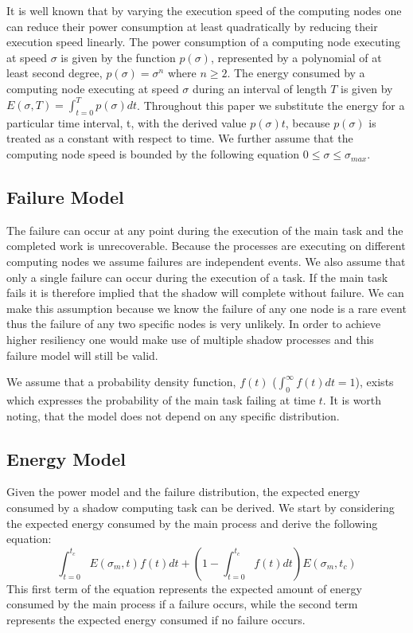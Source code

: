 It is well known that by varying the execution speed of the computing
nodes one can reduce their power consumption at least quadratically by
reducing their execution speed linearly. The power consumption of a
computing node executing at speed $\sigma$ is given by the function
$p(\sigma)$, represented by a polynomial of at least second degree,
$p(\sigma)=\sigma^n$ where $n\geq2$. The energy consumed by a
computing node executing at speed $\sigma$ during an interval of
length $T$ is given by $E(\sigma,T)=\int_{t=0}^T
p(\sigma)dt$. Throughout this paper we substitute the energy for a
particular time interval, t, with the derived value $p(\sigma)t$,
because $p(\sigma)$ is treated as a constant with respect to time. We
further assume that the computing node speed is bounded by the
following equation $0\leq\sigma\leq\sigma_{max}$.

\subsection{Failure Model}
\label{failure_model}

The failure can occur at any point during the execution of the main
task and the completed work is unrecoverable. Because the processes
are executing on different computing nodes we assume failures are
independent events. We also assume that only a single failure can
occur during the execution of a task. If the main task fails it is
therefore implied that the shadow will complete without failure. We
can make this assumption because we know the failure of any one node
is a rare event thus the failure of any two specific nodes is very
unlikely. In order to achieve higher resiliency one
would make use of multiple shadow processes and this failure model
will still be valid.

We assume that a probability density function, $f(t)$ ($\int_0^\infty
f(t)dt=1$), exists which expresses the probability of the main task
failing at time $t$. It is worth noting, that the model does not
depend on any specific distribution.

\subsection{Energy Model}
\label{energy_model}

Given the power model and the failure distribution, the expected
energy consumed by a shadow computing task can be derived. We start by
considering the expected energy consumed by the main process and
derive the following equation:
\begin{equation}
\label{energy_for_main}
\int_{t=0}^{t_c}E(\sigma_m,t)f(t)dt + (1-\int_{t=0}^{t_c}f(t)dt)E(\sigma_m,t_c)
\end{equation}
This first term of the equation represents the expected amount of
energy consumed by the main process if a failure occurs, while the
second term represents the expected energy consumed if no failure
occurs.


